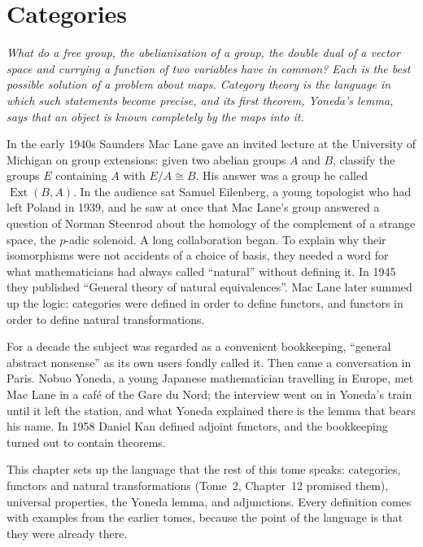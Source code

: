 \chapter{Categories}

\begin{center}\itshape
What do a free group, the abelianisation of a group, the double dual of a vector space and currying a function of two variables have in common? Each is the best possible
solution of a problem about maps. Category theory is the language in which such statements become precise, and its first theorem, Yoneda's lemma, says that an object is
known completely by the maps into it.
\end{center}

In the early 1940s Saunders Mac Lane gave an invited lecture at the University of Michigan on group extensions: given two abelian groups $A$ and $B$, classify the groups $E$
containing $A$ with $E/A\cong B$. His answer was a group he called $\operatorname{Ext}(B,A)$. In the audience sat Samuel Eilenberg, a young topologist who had left Poland in 1939,
and he saw at once that Mac Lane's group answered a question of Norman Steenrod about the homology of the complement of a strange space, the $p$-adic solenoid. A long
collaboration began. To explain why their isomorphisms were not accidents of a choice of basis, they needed a word for what
mathematicians had always called ``natural'' without defining it. In 1945 they published ``General theory of natural equivalences''. Mac Lane later summed up the logic:
categories were defined in order to define functors, and functors in order to define natural transformations.

For a decade the subject was regarded as a convenient bookkeeping, ``general abstract nonsense'' as its own users fondly called it. Then came a conversation in Paris. Nobuo
Yoneda, a young Japanese mathematician travelling in Europe, met Mac Lane in a café of the Gare du Nord; the interview went on in Yoneda's train until it left the station,
and what Yoneda explained there is the lemma that bears his name. In 1958 Daniel Kan defined adjoint functors, and the bookkeeping turned out to contain theorems.

This chapter sets up the language that the rest of this tome speaks: categories, functors and natural transformations (Tome~2, Chapter~12 promised them), universal
properties, the Yoneda lemma, and adjunctions. Every definition comes with examples from the earlier tomes, because the point of the language is that they were already
there.

